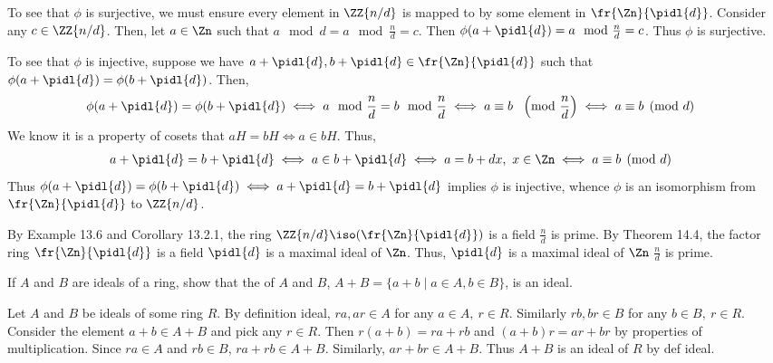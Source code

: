 \documentclass{article}
\begin{document}
\begin{solution}
\begin{enumerate}[label=\tbo{\alph*.}]
\begin{subproof}[Claim 1]
\begin{subproof}[Claim 2]
        To see that \( \phi \) is surjective, we must ensure every element in \( \ZZ{n/d} \) is mapped to by some element in \( \fr{\Zn}{\pidl{d}} \).
        Consider any \( c\in\ZZ{n/d} \).
        Then, let \( a\in\Zn \) such that \( a\mod d = a\mod{\frac{n}{d}} = c \).
        Then \( \phi(a+\pidl{d}) = a\mod{\frac{n}{d}} = c \).
        Thus \( \phi \) is surjective.

        To see that \( \phi \) is injective, suppose we have \( a+\pidl{d}, b+\pidl{d}\in\fr{\Zn}{\pidl{d}} \) such that \( \phi(a+\pidl{d}) = \phi(b+\pidl{d}) \).
        Then, \begin{align*}
          \phi(a+\pidl{d}) = \phi(b+\pidl{d}) &\iff a\mod{\frac{n}{d}} = b\mod{\frac{n}{d}} \iff a \equiv b\ \,\, \left(\text{mod }\frac{n}{d}\right) \iff a \equiv b\pmod d
        \end{align*}
        We know it is a property of cosets that \( aH=bH \iff a\in bH \).
        Thus, \begin{align*}
          a+\pidl{d} = b+\pidl{d} &\iff a\in b+\pidl{d} \iff a = b+dx,\ x\in\Zn \iff a\equiv b\pmod d
        \end{align*}
        Thus \( \phi(a+\pidl{d}) = \phi(b+\pidl{d})\iff a+\pidl{d}=b+\pidl{d} \) implies \( \phi \) is injective, whence \( \phi \) is an isomorphism from \( \fr{\Zn}{\pidl{d}} \) to \( \ZZ{n/d} \).
      \end{subproof}
      By Example 13.6 and Corollary 13.2.1, the ring \( \ZZ{n/d}\iso (\fr{\Zn}{\pidl{d}}) \) is a field \iff \( \frac{n}{d} \) is prime.
      By Theorem 14.4, the factor ring \( \fr{\Zn}{\pidl{d}} \) is a field \iff \( \pidl{d} \) is a maximal ideal of \( \Zn \).
      Thus, \( \pidl{d} \) is a maximal ideal of \( \Zn \) \iff \( \frac{n}{d} \) is prime.
    \end{subproof}
\end{enumerate}
\end{solution}
\pagebreak

If \( A \) and \( B \) are ideals of a ring, show that the  of \( A \) and \( B \), \( A+B = \{a+b\mid a\in A,b\in B\} \), is an ideal.

\begin{solution} %
  Let \( A \) and \( B \) be ideals of some ring \( R \). By definition ideal, \( ra,ar\in A \) for any \( a\in A,\ r\in R \). Similarly \( rb,br\in B \) for any \( b\in B,\ r\in R \). Consider the element \( a+b\in A+B \) and pick any \( r\in R \). Then \( r(a+b) = ra+rb \) and \( (a+b)r = ar+br \) by properties of multiplication. Since \( ra\in A \) and \( rb\in B \), \( ra+rb \in A+B \). Similarly, \( ar+br \in A+B \). Thus \( A+B \) is an ideal of \( R \) by def ideal.
\end{solution}
\end{document}

